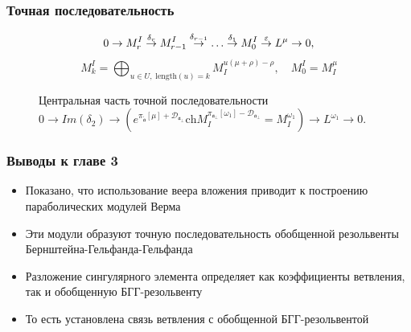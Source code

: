 \documentclass[pdftex]{beamer}
\newcommand{\afb}{\mathfrak{a}_{\bot}}
\newcommand{\aft}{\widetilde{\mathfrak{a}}}
\theoremstyle{definition} \newtheorem{Def}{Определение}
\begin{document}
\begin{frame}
  \frametitle{Точная последовательность}
  \begin{equation*}
    0\rightarrow M_{r}^{I}\overset{\delta _{r}}{\rightarrow }M_{r-1}^{I}\overset{%
      \delta _{r-1}}{\rightarrow }\ldots \overset{\delta _{1}}{\rightarrow }%
    M_{0}^{I}\overset{\varepsilon }{\rightarrow }L^{\mu }\rightarrow 0,
  \end{equation*}
  \begin{equation*}
    M_{k}^{I}=\bigoplus_{u\in U,\;\mathrm{length}\left( u\right)
      =k}M_{I}^{u\left( \mu +\rho \right) -\rho },\quad M_{0}^{I}=M_{I}^{\mu }
  \end{equation*}
  \vspace{-0.5cm}
  \begin{figure}[h!bt]
    \noindent{}
\vspace{-0.5cm}
    \caption{
      Центральная часть точной последовательности
      $0 \to Im(\delta_2) \to \left( e^{\pi _{\aft}\left[ \mu \right] + \mathcal{D}_{\afb}}\mathrm{ch}M_{I}^{\pi _{\afb}\left[ \omega_1 \right] -
          \mathcal{D}_{\afb} }=M^{\omega_1}_{I}\right) \to
      L^{\omega_1}\to 0 $.  
    }
  \end{figure}
\end{frame}
\begin{frame}
  \frametitle{Выводы к главе 3}
  \begin{itemize}
  \item Показано, что использование веера вложения приводит к построению параболических модулей Верма
  \item Эти модули образуют точную последовательность обобщенной резольвенты Бернштейна-Гельфанда-Гельфанда
  \item Разложение сингулярного элемента определяет как коэффициенты ветвления, так и обобщенную БГГ-резольвенту
  \item То есть установлена связь ветвления с обобщенной БГГ-резольвентой
  \end{itemize}
\end{frame}
\end{document}
